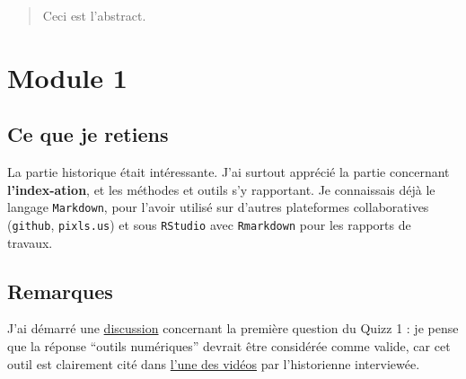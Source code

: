 \documentclass[]{article}
\title{}
\author{}
\begin{document}
 
\maketitle

\begin{abstract}

Ceci est l'abstract.

\end{abstract}

\hypertarget{module-1}{%
	\section{Module 1}\label{module-1}}

\hypertarget{ce-que-je-retiens}{%
	\subsection{Ce que je retiens}\label{ce-que-je-retiens}}

La partie historique était intéressante. J'ai surtout apprécié la partie
concernant \textbf{l'index-ation}, et les méthodes et outils s'y
rapportant. Je connaissais déjà le langage \texttt{Markdown}, pour
l'avoir utilisé sur d'autres plateformes collaboratives
(\texttt{github}, \texttt{pixls.us}) et sous \texttt{RStudio} avec
\texttt{Rmarkdown} pour les rapports de travaux.

\hypertarget{remarques}{%
	\subsection{Remarques}\label{remarques}}

J'ai démarré une
\href{https://www.fun-mooc.fr/courses/course-v1:inria+41016+session01bis/discussion/forum/c309fd5170d67bde98ab305f18f063d9a55554f8/threads/5bce23551c89dc02ae005933}{discussion}
concernant la première question du Quizz 1 : je pense que la réponse
``outils numériques'' devrait être considérée comme valide, car cet
outil est clairement cité dans
\href{https://d381hmu4snvm3e.cloudfront.net/videos/ZXRQTwenN9LW/SD.mp4}{l'une
	des vidéos} par l'historienne interviewée.
\end{document}
